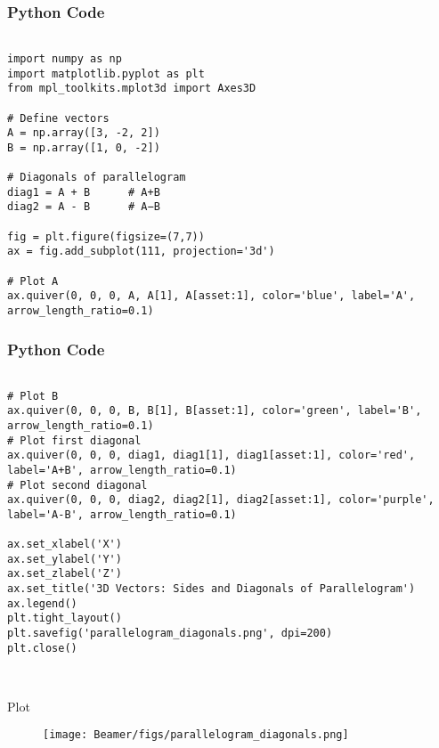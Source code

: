 \documentclass{beamer}
\begin{document}
\begin{frame}[fragile]
    \frametitle{Python Code}
    \begin{lstlisting}

import numpy as np
import matplotlib.pyplot as plt
from mpl_toolkits.mplot3d import Axes3D

# Define vectors
A = np.array([3, -2, 2])
B = np.array([1, 0, -2])

# Diagonals of parallelogram
diag1 = A + B      # A+B
diag2 = A - B      # A−B

fig = plt.figure(figsize=(7,7))
ax = fig.add_subplot(111, projection='3d')

# Plot A
ax.quiver(0, 0, 0, A, A[1], A[asset:1], color='blue', label='A', arrow_length_ratio=0.1)

    \end{lstlisting}
\end{frame}


\begin{frame}[fragile]
    \frametitle{Python Code}
    \begin{lstlisting}

# Plot B
ax.quiver(0, 0, 0, B, B[1], B[asset:1], color='green', label='B', arrow_length_ratio=0.1)
# Plot first diagonal
ax.quiver(0, 0, 0, diag1, diag1[1], diag1[asset:1], color='red', label='A+B', arrow_length_ratio=0.1)
# Plot second diagonal
ax.quiver(0, 0, 0, diag2, diag2[1], diag2[asset:1], color='purple', label='A-B', arrow_length_ratio=0.1)

ax.set_xlabel('X')
ax.set_ylabel('Y')
ax.set_zlabel('Z')
ax.set_title('3D Vectors: Sides and Diagonals of Parallelogram')
ax.legend()
plt.tight_layout()
plt.savefig('parallelogram_diagonals.png', dpi=200)
plt.close()



    \end{lstlisting}
\end{frame}




  
\begin{frame}{Plot}
\begin{figure}
    \centering
    \texttt{[image: Beamer/figs/parallelogram\_diagonals.png]}
    \caption{}
    \label{fig:placeholder}
\end{figure}
\end{frame}
\end{document}
